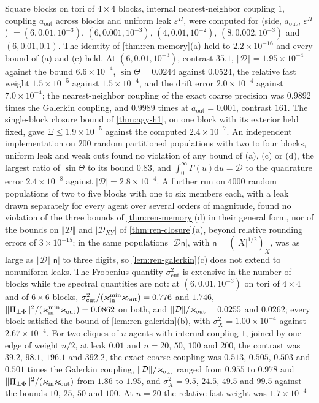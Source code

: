 \begin{numcheck}\label{chk:ren-memory}
Square blocks on tori of $4\times4$ blocks, internal nearest-neighbor coupling $1$, coupling $a_{\mathrm{out}}$ across blocks and uniform leak $\varepsilon^\Pi$, were computed for (side, $a_{\mathrm{out}}$, $\varepsilon^\Pi$) $=(6,0.01,10^{-3})$, $(6,0.001,10^{-3})$, $(4,0.01,10^{-2})$, $(8,0.002,10^{-3})$ and $(6,0.01,0.1)$. The identity of \cref{thm:ren-memory}(a) held to $2.2\times10^{-16}$ and every bound of (a) and (c) held. At $(6,0.01,10^{-3})$, contrast $35.1$, $\Vert\mathcal D\Vert=1.95\times10^{-4}$ against the bound $6.6\times10^{-4}$, $\sin\Theta=0.0244$ against $0.0524$, the relative fast weight $1.5\times10^{-5}$ against $1.5\times10^{-4}$, and the drift error $2.0\times10^{-4}$ against $7.0\times10^{-4}$; the nearest-neighbor coupling of the exact coarse precision was $0.9892$ times the Galerkin coupling, and $0.9989$ times at $a_{\mathrm{out}}=0.001$, contrast $161$. The single-block closure bound of \cref{thm:agy-h1}, on one block with its exterior held fixed, gave $\Xi\le1.9\times10^{-5}$ against the computed $2.4\times10^{-7}$. An independent implementation on $200$ random partitioned populations with two to four blocks, uniform leak and weak cuts found no violation of any bound of (a), (c) or (d), the largest ratio of $\sin\Theta$ to its bound $0.83$, and $\int_0^\infty\Gamma(u)\mathrm du=\mathcal D$ to the quadrature error $2.4\times10^{-8}$ against $\lvert\mathcal D\rvert=2.8\times10^{-4}$. A further run on $4000$ random populations of two to five blocks with one to six members each, with a leak drawn separately for every agent over several orders of magnitude, found no violation of the three bounds of \cref{thm:ren-memory}(d) in their general form, nor of the bounds on $\Vert\mathcal D\Vert$ and $\lvert\mathcal D_{XY}\rvert$ of \cref{thm:ren-closure}(a), beyond relative rounding errors of $3\times10^{-15}$; in the same populations $\lvert\mathcal D\mathsf n\rvert$, with $\mathsf n=(\lvert X\rvert^{1/2})_X$, was as large as $\Vert\mathcal D\Vert\lvert\mathsf n\rvert$ to three digits, so \cref{lem:ren-galerkin}(c) does not extend to nonuniform leaks. The Frobenius quantity $\sigma^2_{\mathrm{cut}}$ is extensive in the number of blocks while the spectral quantities are not: at $(6,0.01,10^{-3})$ on tori of $4\times4$ and of $6\times6$ blocks, $\sigma^2_{\mathrm{cut}}/(\varkappa_{\mathrm{in}}^{\min}\varkappa_{\mathrm{out}})=0.776$ and $1.746$, $\Vert\Pi_{\perp\Phi}\Vert^2/(\varkappa_{\mathrm{in}}^{\min}\varkappa_{\mathrm{out}})=0.0862$ on both, and $\Vert\mathcal D\Vert/\varkappa_{\mathrm{out}}=0.0255$ and $0.0262$; every block satisfied the bound of \cref{lem:ren-galerkin}(b), with $\sigma_X^2=1.00\times10^{-4}$ against $2.67\times10^{-4}$. For two cliques of $n$ agents with internal coupling $1$, joined by one edge of weight $n/2$, at leak $0.01$ and $n=20$, $50$, $100$ and $200$, the contrast was $39.2$, $98.1$, $196.1$ and $392.2$, the exact coarse coupling was $0.513$, $0.505$, $0.503$ and $0.501$ times the Galerkin coupling, $\Vert\mathcal D\Vert/\varkappa_{\mathrm{out}}$ ranged from $0.955$ to $0.978$ and $\Vert\Pi_{\perp\Phi}\Vert^2/(\varkappa_{\mathrm{in}}\varkappa_{\mathrm{out}})$ from $1.86$ to $1.95$, and $\sigma_X^2=9.5$, $24.5$, $49.5$ and $99.5$ against the bounds $10$, $25$, $50$ and $100$. At $n=20$ the relative fast weight was $1.7\times10^{-4}$ 
\end{numcheck}
